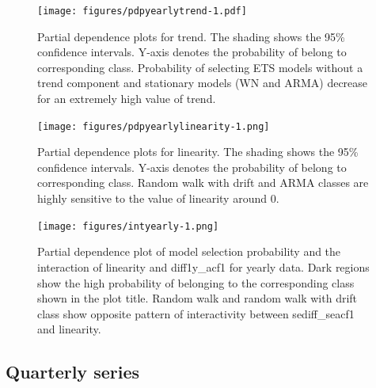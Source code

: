 \documentclass[11pt,a4paper,]{article}
\begin{document}
\begin{figure}
\centering
\texttt{[image: figures/pdpyearlytrend-1.pdf]}
\caption{\label{fig:pdpyearlytrend}Partial dependence plots for trend. The shading shows the 95\% confidence intervals. Y-axis denotes the probability of belong to corresponding class. Probability of selecting ETS models without a trend component and stationary models (WN and ARMA) decrease for an extremely high value of trend.}
\end{figure}

\begin{figure}
\centering
\texttt{[image: figures/pdpyearlylinearity-1.png]}
\caption{\label{fig:pdpyearlylinearity}Partial dependence plots for linearity. The shading shows the 95\% confidence intervals. Y-axis denotes the probability of belong to corresponding class. Random walk with drift and ARMA classes are highly sensitive to the value of linearity around 0.}
\end{figure}

\begin{figure}
\centering
\texttt{[image: figures/intyearly-1.png]}
\caption{\label{fig:intyearly}Partial dependence plot of model selection probability and the interaction of linearity and diff1y\_acf1 for yearly data. Dark regions show the high probability of belonging to the corresponding class shown in the plot title. Random walk and random walk with drift class show opposite pattern of interactivity between sediff\_seacf1 and linearity.}
\end{figure}

\hypertarget{quarterly-series}{%
\subsection{Quarterly series}\label{quarterly-series}}
\end{document}
